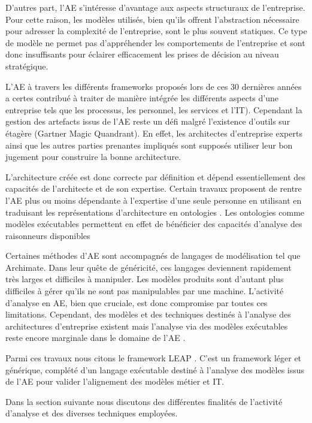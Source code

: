 D'autres part, l'AE s'intéresse d'avantage aux aspects structuraux de l'entreprise. Pour cette raison, les modèles utilisés, bien qu'ils offrent l'abstraction nécessaire pour adresser la complexité de l'entreprise, sont le plus souvent statiques. Ce type de modèle ne permet pas d'appréhender les comportements de l'entreprise et sont donc insuffisants pour éclairer efficacement les prises de décision au niveau stratégique.

L'AE à travers les différents frameworks proposés lors de ces 30 dernières années a certes contribué à traiter de manière intégrée les différents aspects d'une entreprise tels que les processus, les personnel, les services et l'IT). Cependant la gestion des artefacts issus de l'AE reste un défi \cite{zachman1997enterprise} malgré l'existence d'outils sur étagère (Gartner Magic Quandrant). En effet, les architectes d'entreprise experts ainsi que les autres parties prenantes impliqués sont supposés utiliser leur bon jugement pour construire la bonne architecture. 

L'architecture créée est donc correcte par définition et dépend essentiellement des capacités de l'architecte et de son expertise. Certain travaux proposent de rentre l'AE plus ou moins dépendante à l'expertise d'une seule personne en utilisant en traduisant les représentations d'architecture en ontologies \cite{sunkle_analyzing_2013}. Les ontologies comme modèles exécutables permettent en effet de bénéficier des capacités d'analyse des raisonneurs disponibles 

Certaines méthodes d'AE sont accompagnés de langages de modélisation tel que Archimate. Dans leur quête de généricité, ces langages deviennent rapidement très larges et difficiles à manipuler. Les modèles produits sont d'autant plus difficiles à gérer qu'ils ne sont pas manipulables par une machine. L'activité d'analyse en AE, bien que cruciale, est donc compromise par toutes ces limitations. Cependant, des modèles et des techniques destinés à l'analyse des architectures d'entreprise existent mais l'analyse via des modèles exécutables reste encore marginale dans le domaine de l'AE \cite{kulkarni2013modelling}. 

Parmi ces travaux nous citons le framework LEAP \cite{clark2011leap}. C'est un framework léger et générique, complété d'un langage exécutable destiné à l'analyse des modèles issus de l'AE pour valider l'alignement des modèles métier et IT. 

Dans la section suivante nous discutons des différentes finalités de l'activité d'analyse et des diverses techniques employées.


